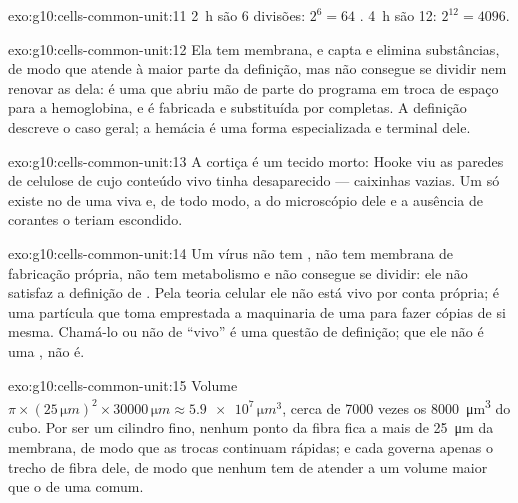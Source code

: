 \begin{solution}{exo:g10:cells-common-unit:11}
\qty{2}{h} são 6 divisões: $2^6 = 64$ . \qty{4}{h} são 12:
$2^{12} = 4096$.
\end{solution}

\begin{solution}{exo:g10:cells-common-unit:12}
Ela tem membrana,  e capta e elimina substâncias, de modo que
atende à maior parte da definição, mas não consegue se dividir nem
renovar as  dela: é uma  que abriu mão de parte do
programa em troca de espaço para a hemoglobina, e é fabricada e
substituída por  completas. A definição descreve o caso geral; a
hemácia é uma forma especializada e terminal dele.
\end{solution}

\begin{solution}{exo:g10:cells-common-unit:13}
A cortiça é um tecido morto: Hooke viu as paredes de celulose de
 cujo conteúdo vivo tinha desaparecido --- caixinhas vazias. Um
 só existe no  de uma  viva e, de todo modo, a
 do microscópio dele e a ausência de corantes o teriam
escondido.
\end{solution}

\begin{solution}{exo:g10:cells-common-unit:14}
Um vírus não tem , não tem membrana de fabricação própria,
não tem metabolismo e não consegue se dividir: ele não satisfaz a
definição de . Pela teoria celular ele não está vivo por conta
própria; é uma partícula que toma emprestada a maquinaria de uma 
para fazer cópias de si mesma. Chamá-lo ou não de ``vivo'' é uma questão
de definição; que ele não é uma , não é.
\end{solution}

\begin{solution}{exo:g10:cells-common-unit:15}
Volume $\pi \times (25\,\unit{\micro m})^2 \times 30000\,\unit{\micro m}
\approx \num{5.9e7}\,\unit{\micro m^3}$, cerca de 7000 vezes os
\qty{8000}{\micro m^3} do cubo. Por ser um cilindro fino, nenhum ponto
da fibra fica a mais de \qty{25}{\micro m} da membrana, de modo que as
trocas continuam rápidas; e cada  governa apenas o trecho de
fibra dele, de modo que nenhum  tem de atender a um volume maior
que o de uma  comum.
\end{solution}

